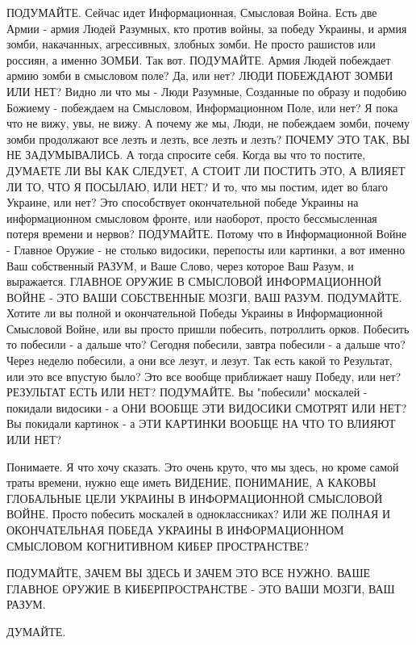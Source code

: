 ПОДУМАЙТЕ. Сейчас идет Информационная, Смысловая Война. Есть две Армии - армия
Людей Разумных, кто против войны, за победу Украины, и армия зомби, накачанных,
агрессивных, злобных зомби. Не просто рашистов или россиян, а именно ЗОМБИ. Так
вот. ПОДУМАЙТЕ. Армия Людей побеждает армию зомби в смысловом поле? Да, или
нет? ЛЮДИ ПОБЕЖДАЮТ ЗОМБИ ИЛИ НЕТ? Видно ли что мы - Люди Разумные, Созданные
по образу и подобию Божиему - побеждаем на Смысловом, Информационном Поле, или
нет? Я пока что не вижу, увы, не вижу. А почему же мы, Люди, не побеждаем
зомби, почему зомби продолжают все лезть и лезть, все лезть и лезть? ПОЧЕМУ ЭТО
ТАК, ВЫ НЕ ЗАДУМЫВАЛИСЬ. А тогда спросите себя. Когда вы что то постите,
ДУМАЕТЕ ЛИ ВЫ КАК СЛЕДУЕТ, А СТОИТ ЛИ ПОСТИТЬ ЭТО, А ВЛИЯЕТ ЛИ ТО, ЧТО Я
ПОСЫЛАЮ, ИЛИ НЕТ? И то, что мы постим, идет во благо Украине, или нет? Это
способствует окончательной победе Украины на информационном смысловом фронте,
или наоборот, просто бессмысленная потеря времени и нервов? ПОДУМАЙТЕ. Потому
что в Информационной Войне - Главное Оружие - не столько видосики, перепосты
или картинки, а вот именно Ваш собственный РАЗУМ, и Ваше Слово, через которое
Ваш Разум, и выражается. ГЛАВНОЕ ОРУЖИЕ В СМЫСЛОВОЙ ИНФОРМАЦИОННОЙ ВОЙНЕ - ЭТО
ВАШИ СОБСТВЕННЫЕ МОЗГИ, ВАШ РАЗУМ. ПОДУМАЙТЕ. Хотите ли вы полной и
окончательной Победы Украины в Информационной Смысловой Войне, или вы просто
пришли побесить, потроллить орков. Побесить то побесили - а дальше что? Сегодня
побесили, завтра побесили - а дальше что? Через неделю побесили, а они все
лезут, и лезут. Так есть какой то Результат, или это все впустую было? Это все
вообще приближает нашу Победу, или нет? РЕЗУЛЬТАТ ЕСТЬ ИЛИ НЕТ? ПОДУМАЙТЕ. Вы
"побесили" москалей - покидали видосики - а ОНИ ВООБЩЕ ЭТИ ВИДОСИКИ СМОТРЯТ ИЛИ
НЕТ? Вы покидали картинок - а ЭТИ КАРТИНКИ ВООБЩЕ НА ЧТО ТО ВЛИЯЮТ ИЛИ НЕТ? 

Понимаете. Я что хочу сказать. Это очень круто, что мы здесь, но кроме самой
траты времени, нужно еще иметь ВИДЕНИЕ, ПОНИМАНИЕ, А КАКОВЫ ГЛОБАЛЬНЫЕ ЦЕЛИ
УКРАИНЫ В ИНФОРМАЦИОННОЙ СМЫСЛОВОЙ ВОЙНЕ.  Просто побесить москалей в
одноклассниках? ИЛИ ЖЕ ПОЛНАЯ И ОКОНЧАТЕЛЬНАЯ ПОБЕДА УКРАИНЫ В ИНФОРМАЦИОННОМ
СМЫСЛОВОМ КОГНИТИВНОМ КИБЕР ПРОСТРАНСТВЕ?

ПОДУМАЙТЕ, ЗАЧЕМ ВЫ ЗДЕСЬ И ЗАЧЕМ ЭТО ВСЕ НУЖНО. ВАШЕ ГЛАВНОЕ ОРУЖИЕ В
КИБЕРПРОСТРАНСТВЕ - ЭТО ВАШИ МОЗГИ, ВАШ РАЗУМ. 

ДУМАЙТЕ.
